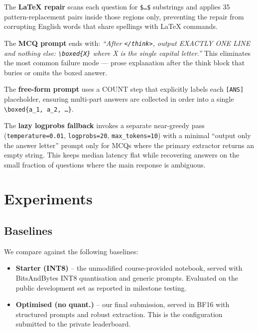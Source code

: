 \documentclass{article}
\begin{document}
\noindent
The \textbf{LaTeX repair} scans each question for \texttt{\$\ldots\$}
substrings and applies 35 pattern-replacement pairs inside those regions
only, preventing the repair from corrupting English words that share
spellings with LaTeX commands.

The \textbf{MCQ prompt} ends with: \textit{``After \texttt{</think>}, output
EXACTLY ONE LINE and nothing else: \texttt{\textbackslash boxed\{X\}} where
X is the single capital letter.''}
This eliminates the most common failure mode — prose explanation after the
think block that buries or omits the boxed answer.

The \textbf{free-form prompt} uses a COUNT step that explicitly labels each
\texttt{[ANS]} placeholder, ensuring multi-part answers are collected in
order into a single \texttt{\textbackslash boxed\{a\_1, a\_2, \ldots\}}.

The \textbf{lazy logprobs fallback} invokes a separate near-greedy pass
(\texttt{temperature=0.01}, \texttt{logprobs=20}, \texttt{max\_tokens=10})
with a minimal ``output only the answer letter'' prompt only for MCQs where
the primary extractor returns an empty string.
This keeps median latency flat while recovering answers on the small fraction
of questions where the main response is ambiguous.


\section{Experiments}
\label{sec:experiments}

\subsection{Baselines}
\label{sec:baselines}

We compare against the following baselines:
\begin{itemize}
  \item \textbf{Starter (INT8)} -- the unmodified course-provided notebook,
    served with BitsAndBytes INT8 quantisation and generic prompts.
    Evaluated on the public development set as reported in milestone testing.

  \item \textbf{Optimised (no quant.)} -- our final submission, served in
    BF16 with structured prompts and robust extraction.
    This is the configuration submitted to the private leaderboard.
\end{itemize}
\end{document}
